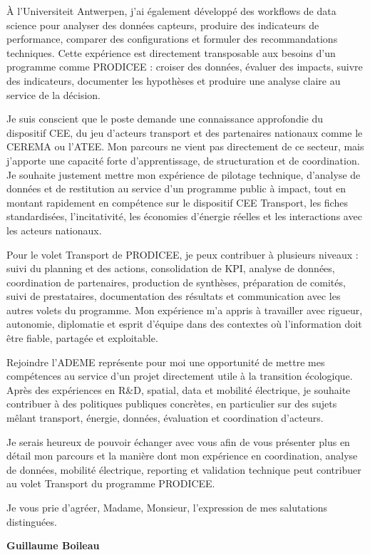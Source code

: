 \documentclass[11pt,a4paper]{altacv}
\begin{document}
{À l’Universiteit Antwerpen, j’ai également développé des workflows de data science pour analyser des données capteurs, produire des indicateurs de performance, comparer des configurations et formuler des recommandations techniques. Cette expérience est directement transposable aux besoins d’un programme comme PRODICEE : croiser des données, évaluer des impacts, suivre des indicateurs, documenter les hypothèses et produire une analyse claire au service de la décision.

Je suis conscient que le poste demande une connaissance approfondie du dispositif CEE, du jeu d’acteurs transport et des partenaires nationaux comme le CEREMA ou l’ATEE. Mon parcours ne vient pas directement de ce secteur, mais j’apporte une capacité forte d’apprentissage, de structuration et de coordination. Je souhaite justement mettre mon expérience de pilotage technique, d’analyse de données et de restitution au service d’un programme public à impact, tout en montant rapidement en compétence sur le dispositif CEE Transport, les fiches standardisées, l’incitativité, les économies d’énergie réelles et les interactions avec les acteurs nationaux.

Pour le volet Transport de PRODICEE, je peux contribuer à plusieurs niveaux : suivi du planning et des actions, consolidation de KPI, analyse de données, coordination de partenaires, production de synthèses, préparation de comités, suivi de prestataires, documentation des résultats et communication avec les autres volets du programme. Mon expérience m’a appris à travailler avec rigueur, autonomie, diplomatie et esprit d’équipe dans des contextes où l’information doit être fiable, partagée et exploitable.

Rejoindre l’ADEME représente pour moi une opportunité de mettre mes compétences au service d’un projet directement utile à la transition écologique. Après des expériences en R\&D, spatial, data et mobilité électrique, je souhaite contribuer à des politiques publiques concrètes, en particulier sur des sujets mêlant transport, énergie, données, évaluation et coordination d’acteurs.

Je serais heureux de pouvoir échanger avec vous afin de vous présenter plus en détail mon parcours et la manière dont mon expérience en coordination, analyse de données, mobilité électrique, reporting et validation technique peut contribuer au volet Transport du programme PRODICEE.

Je vous prie d’agréer, Madame, Monsieur, l’expression de mes salutations distinguées.

\textbf{Guillaume Boileau}

}
\end{document}
